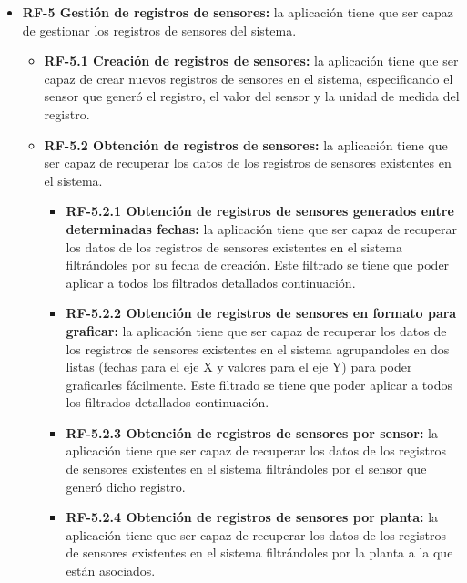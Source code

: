 \begin{itemize}
        \item \textbf{RF-5 Gestión de registros de sensores:} la aplicación tiene que ser capaz de gestionar los registros de sensores del sistema.
            \begin{itemize}
                \item \textbf{RF-5.1 Creación de registros de sensores:} la aplicación tiene que ser capaz de crear nuevos registros de sensores en el sistema, especificando el sensor que generó el registro,  el valor del sensor y la unidad de medida del registro.
                \item \textbf{RF-5.2 Obtención de registros de sensores:} la aplicación tiene que ser capaz de recuperar los datos de los registros de sensores existentes en el sistema.
                \begin{itemize}
                    \item \textbf{RF-5.2.1 Obtención de registros de sensores generados entre determinadas fechas:} la aplicación tiene que ser capaz de recuperar los datos de los registros de sensores existentes en el sistema filtrándoles por su fecha de creación. Este filtrado se tiene que poder aplicar a todos los filtrados detallados continuación. 
                    \item \textbf{RF-5.2.2 Obtención de registros de sensores en formato para graficar:} la aplicación tiene que ser capaz de recuperar los datos de los registros de sensores existentes en el sistema agrupandoles en dos listas (fechas para el eje X y valores para el eje Y) para poder graficarles fácilmente. Este filtrado se tiene que poder aplicar a todos los filtrados detallados continuación. 
                    \item \textbf{RF-5.2.3 Obtención de registros de sensores por sensor:} la aplicación tiene que ser capaz de recuperar los datos de los registros de sensores existentes en el sistema filtrándoles por el sensor que generó dicho registro.
                    \item \textbf{RF-5.2.4 Obtención de registros de sensores por planta:} la aplicación tiene que ser capaz de recuperar los datos de los registros de sensores existentes en el sistema filtrándoles por la planta a la que están asociados.
                \end{itemize}
            \end{itemize}
            

\end{itemize}
